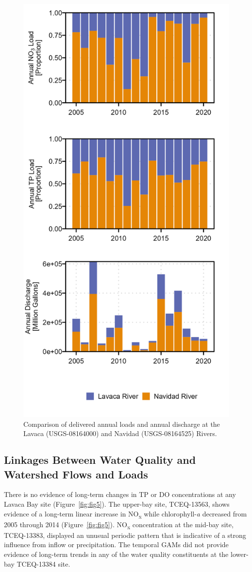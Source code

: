 \documentclass[sn-basic,referee,lineno,pdflatex]{sn-jnl}
\begin{document}
\begin{figure}

{\centering \includegraphics[width=0.5\linewidth,]{Schramm-2023-05-AS_files/figure-latex/fig4-1} 

}

\caption{Comparison of delivered annual loads and annual discharge at the Lavaca (USGS-08164000) and Navidad (USGS-08164525) Rivers.}\label{fig:fig4}
\end{figure}

\hypertarget{linkages-between-water-quality-and-watershed-flows-and-loads}{%
\subsection{Linkages Between Water Quality and Watershed Flows and
Loads}\label{linkages-between-water-quality-and-watershed-flows-and-loads}}

There is no evidence of long-term changes in TP or DO concentrations at
any Lavaca Bay site (Figure~\ref{fig:fig5}). The upper-bay site,
TCEQ-13563, shows evidence of a long-term linear increase in
NO\textsubscript{x} while chlorophyll-\emph{a} decreased from 2005
through 2014 (Figure~\ref{fig:fig5}). NO\textsubscript{x} concentration
at the mid-bay site, TCEQ-13383, displayed an unusual periodic pattern
that is indicative of a strong influence from inflow or precipitation.
The temporal GAMs did not provide evidence of long-term trends in any of
the water quality constituents at the lower-bay TCEQ-13384 site.
\end{document}
